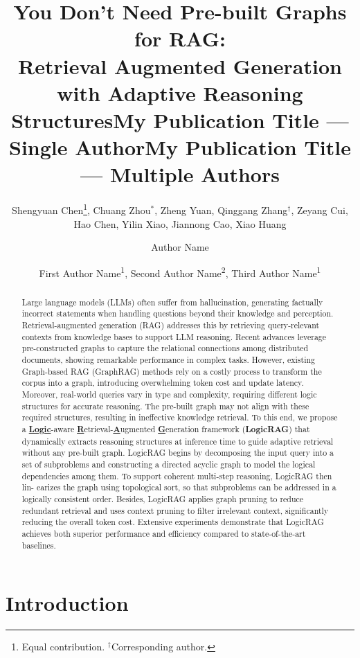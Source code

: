 \documentclass[letterpaper]{article} %
\title{You Don't Need Pre-built Graphs for RAG: \\ Retrieval Augmented Generation with Adaptive Reasoning Structures}
\author{
    Shengyuan Chen\thanks{Equal contribution. $^{\dagger}$Corresponding author.},
    Chuang Zhou$^*$, 
    Zheng Yuan,
    Qinggang Zhang$^{\dagger}$,
    Zeyang Cui,
    Hao Chen,
    Yilin Xiao,
    Jiannong Cao,
    Xiao Huang
}
\title{My Publication Title --- Single Author}
\author {
    Author Name
}
\title{My Publication Title --- Multiple Authors}
\author {
    First Author Name\textsuperscript{\rm 1},
    Second Author Name\textsuperscript{\rm 2},
    Third Author Name\textsuperscript{\rm 1}
}
\begin{document}
\maketitle

\begin{abstract}
Large language models (LLMs) often suffer from hallucination, generating factually incorrect statements when handling questions beyond their knowledge and perception. Retrieval-augmented generation (RAG) addresses this by retrieving query-relevant contexts from knowledge bases to support LLM reasoning. Recent advances leverage pre-constructed graphs to capture the relational connections among distributed documents, showing remarkable performance in complex tasks. However, existing Graph-based RAG (GraphRAG) methods rely on a costly process to transform the corpus into a graph, introducing overwhelming token cost and update latency. Moreover, real-world queries vary in type and complexity, requiring different logic structures for accurate reasoning. The pre-built graph may not align with these required structures, resulting in ineffective knowledge retrieval.
To this end, we propose a \textbf{\underline{Logic}}-aware \textbf{\underline{R}}etrieval-\textbf{\underline{A}}ugmented \textbf{\underline{G}}eneration framework (\textbf{LogicRAG}) that 
dynamically extracts reasoning structures at inference time to guide adaptive retrieval without any pre-built graph. 
LogicRAG begins by decomposing the input query
into a set of subproblems and constructing a directed acyclic
graph to model the logical dependencies among
them. To support coherent multi-step reasoning, LogicRAG then lin-
earizes the graph using topological sort, so that subproblems
can be addressed in a logically consistent order.  Besides, LogicRAG applies graph pruning to reduce redundant retrieval and uses context pruning to filter irrelevant context, significantly reducing the overall token cost.
Extensive experiments demonstrate that LogicRAG achieves both superior performance and efficiency compared to state-of-the-art baselines. 



\end{abstract}

\begin{links}
\end{links}


\section{Introduction}
\end{document}
